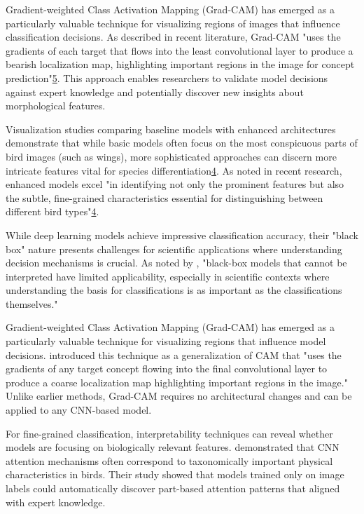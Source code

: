 \documentclass[a4paper,12pt]{report}
\begin{document}
Gradient-weighted Class Activation Mapping (Grad-CAM) has emerged as a particularly valuable technique for visualizing regions of images that influence classification decisions. As described in recent literature, Grad-CAM "uses the gradients of each target that flows into the least convolutional layer to produce a bearish localization map, highlighting important regions in the image for concept prediction"\href{https://www.atlantis-press.com/article/125986223.pdf}{5}. This approach enables researchers to validate model decisions against expert knowledge and potentially discover new insights about morphological features.

Visualization studies comparing baseline models with enhanced architectures demonstrate that while basic models often focus on the most conspicuous parts of bird images (such as wings), more sophisticated approaches can discern more intricate features vital for species differentiation\href{https://www.frontiersin.org/journals/neurorobotics/articles/10.3389/fnbot.2024.1391791/full}{4}. As noted in recent research, enhanced models excel "in identifying not only the prominent features but also the subtle, fine-grained characteristics essential for distinguishing between different bird types"\href{https://www.frontiersin.org/journals/neurorobotics/articles/10.3389/fnbot.2024.1391791/full}{4}.

While deep learning models achieve impressive classification accuracy, their "black box" nature presents challenges for scientific applications where understanding decision mechanisms is crucial. As noted by \citep{montavon2018methods}, "black-box models that cannot be interpreted have limited applicability, especially in scientific contexts where understanding the basis for classifications is as important as the classifications themselves."

Gradient-weighted Class Activation Mapping (Grad-CAM) has emerged as a particularly valuable technique for visualizing regions that influence model decisions. \citep{selvaraju2017grad} introduced this technique as a generalization of CAM that "uses the gradients of any target concept flowing into the final convolutional layer to produce a coarse localization map highlighting important regions in the image." Unlike earlier methods, Grad-CAM requires no architectural changes and can be applied to any CNN-based model.

For fine-grained classification, interpretability techniques can reveal whether models are focusing on biologically relevant features. \citep{zhang2018interpretable} demonstrated that CNN attention mechanisms often correspond to taxonomically important physical characteristics in birds. Their study showed that models trained only on image labels could automatically discover part-based attention patterns that aligned with expert knowledge.
\end{document}
